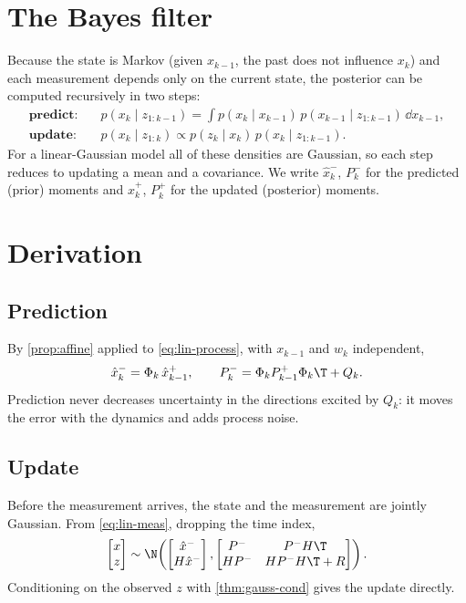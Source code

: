 \section{The Bayes filter}

Because the state is Markov (given $x_{k-1}$, the past does not influence $x_k$) and each measurement
depends only on the current state, the posterior can be computed recursively in two steps:
\begin{align}
  \textbf{predict:}&\quad p(x_k \mid z_{1:k-1}) = \int p(x_k \mid x_{k-1})\, p(x_{k-1}\mid z_{1:k-1})\,\dd x_{k-1}, \\
  \textbf{update:}&\quad p(x_k \mid z_{1:k}) \propto p(z_k \mid x_k)\, p(x_k \mid z_{1:k-1}).
\end{align}
For a linear-Gaussian model all of these densities are Gaussian, so each step reduces to updating a mean
and a covariance. We write $\hat x_k^-$, $P_k^-$ for the predicted (prior) moments and $\hat x_k^+$, $P_k^+$ for
the updated (posterior) moments.

\section{Derivation}

\subsection{Prediction}

By \cref{prop:affine} applied to \eqref{eq:lin-process}, with $x_{k-1}$ and $w_k$ independent,
\begin{equation}
  \hat x_k^- = \Phi_k\,\hat x_{k-1}^+, \qquad P_k^- = \Phi_k P_{k-1}^+\Phi_k\T + Q_k .
  \label{eq:kf-predict}
\end{equation}
Prediction never decreases uncertainty in the directions excited by $Q_k$: it moves the error with the
dynamics and adds process noise.

\subsection{Update}

Before the measurement arrives, the state and the measurement are jointly Gaussian. From
\eqref{eq:lin-meas}, dropping the time index,
\begin{equation}
  \begin{bmatrix} x \\ z \end{bmatrix} \sim \N\!\left(
    \begin{bmatrix} \hat x^- \\ H\hat x^- \end{bmatrix},
    \begin{bmatrix} P^- & P^-H\T \\ HP^- & HP^-H\T + R \end{bmatrix} \right).
\end{equation}
Conditioning on the observed $z$ with \cref{thm:gauss-cond} gives the update directly.

